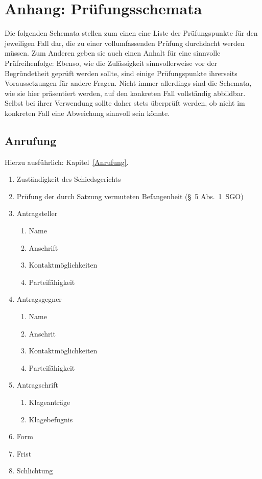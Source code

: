 
\chapter{Anhang: Prüfungsschemata}
\label{Schemata}

Die folgenden Schemata stellen zum einen eine Liste der Prüfungspunkte für den jeweiligen Fall dar, die zu einer vollumfassenden Prüfung durchdacht werden müssen.
Zum Anderen geben sie auch einen Anhalt für eine sinnvolle Prüfreihenfolge:
Ebenso, wie die Zulässigkeit sinnvollerweise vor der Begründetheit geprüft werden sollte, sind einige Prüfungspunkte ihrerseits Voraussetzungen für andere Fragen.
Nicht immer allerdings sind die Schemata, wie sie hier präsentiert werden, auf den konkreten Fall vollständig abbildbar.
Selbst bei ihrer Verwendung sollte daher stets überprüft werden, ob nicht im konkreten Fall eine Abweichung sinnvoll sein könnte.

\section{Anrufung}
\label{Schemata:Anrufung}
Hierzu ausführlich: Kapitel~\ref{Anrufung}.

\begin{enumerate}[label=\Roman*.]
\item Zuständigkeit des Schiedsgerichts
\item Prüfung der durch Satzung vermuteten Befangenheit (\S~5 Abs.~1~SGO)
\item Antragsteller
	\begin{enumerate}
	\item Name
	\item Anschrift
	\item Kontaktmöglichkeiten
	\item Parteifähigkeit
	\end{enumerate}
\item Antragsgegner
	\begin{enumerate}
	\item Name
	\item Anschrit
	\item Kontaktmöglichkeiten
	\item Parteifähigkeit
	\end{enumerate}
\item Antragschrift
	\begin{enumerate}
	\item Klageanträge
	\item Klagebefugnis
	\end{enumerate}
\item Form
\item Frist
\item Schlichtung
\end{enumerate}

